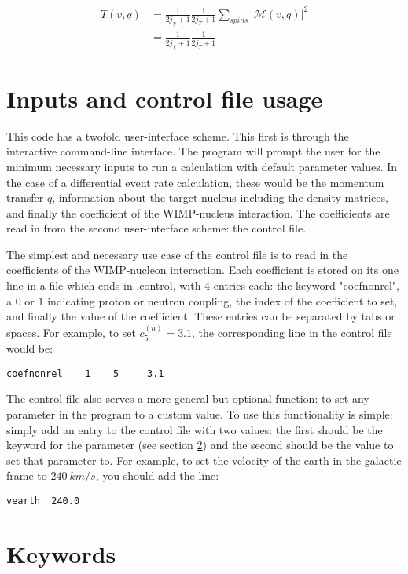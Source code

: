 \documentclass[11pt]{amsart}
\begin{document}
\begin{equation}
\begin{split}
T(v,q) &= \frac{1}{2j_\chi+1}\frac{1}{2j_T+1}\sum_{spins}|\mathcal{M}(v,q)|^2 \\
	&= \frac{1}{2j_\chi+1}\frac{1}{2j_T+1} 
\end{split}
\end{equation}


\section{Inputs and control file usage}
This code has a twofold user-interface scheme. This first is through the interactive command-line interface. The program will prompt the user for the minimum necessary inputs to run a calculation with default parameter values. In the case of a differential event rate calculation, these would be the momentum transfer $q$, information about the target nucleus including the density matrices, and finally the coefficient of the WIMP-nucleus interaction. The coefficients are read in from the second user-interface scheme: the control file. 

The simplest and necessary use case of the control file is to read in the coefficients of the WIMP-nucleon interaction. Each coefficient is stored on its one line in a file which ends in .control, with 4 entries each: the keyword "coefnonrel", a 0 or 1 indicating proton or neutron coupling, the index of the coefficient to set, and finally the value of the coefficient. These entries can be separated by tabs or spaces. For example, to set $c_5^{(n)}=3.1$, the corresponding line in the control file would be:
\begin{verbatim}
coefnonrel    1    5     3.1
\end{verbatim}

The control file also serves a more general but optional function: to set any parameter in the program to a custom value. To use this functionality is simple: simply add an entry to the control file with two values: the first should be the keyword for the parameter (see section \ref{keywords}) and the second should be the value to set that parameter to. For example, to set the velocity of the earth in the galactic frame to $240\ km/s$, you should add the line:
\begin{verbatim}
vearth  240.0
\end{verbatim}

\section{Keywords}\label{keywords}
\end{document}
